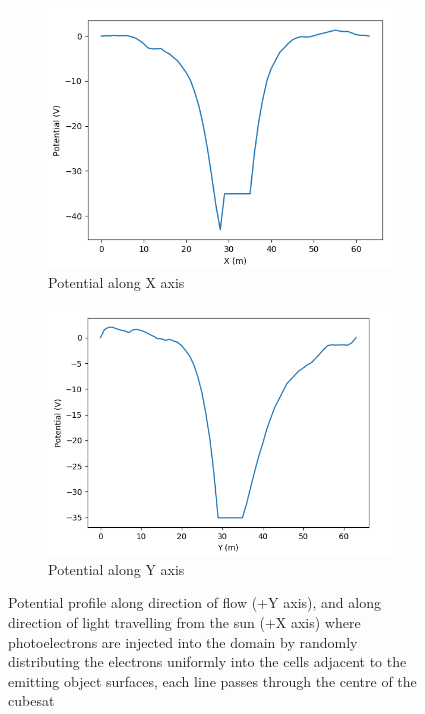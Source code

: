 \begin{figure}[H]
  \begin{subfigure}[b]{0.6\textwidth}
    \includegraphics[width=\textwidth]{figures/DECA/PhotoelectronsInjectionByCellFilling/potentialAlongX.PNG}
    \caption{Potential along X axis}
    \label{fig:CellFillAlongX}
  \end{subfigure}
  \begin{subfigure}[b]{0.6\textwidth}
    \includegraphics[width=\textwidth]{figures/DECA/PhotoelectronsInjectionByCellFilling/potentialAlongY.PNG}
    \caption{Potential along Y axis}
    \label{fig:CellFillAlongY}
  \end{subfigure}
  \label{fig:CELLFILL}
  \caption{Potential profile along direction of flow (+Y axis), and along direction of light travelling from the sun (+X axis) where photoelectrons are injected into the domain by randomly distributing the electrons uniformly into the cells adjacent to the emitting object surfaces, each line passes through the centre of the cubesat}
\end{figure}

